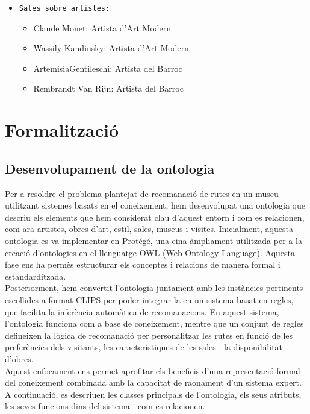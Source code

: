 \documentclass[a4paper]{article}
\begin{document}
	\begin{itemize}
		\item \texttt{Sales sobre artistes: } 
		\begin{itemize}
			\item Claude Monet: Artista d'Art Modern
			\item Wassily Kandinsky: Artista d'Art Modern
			\item ArtemisiaGentileschi: Artista del Barroc
			\item Rembrandt Van Rijn: Artista del Barroc
		\end{itemize}
	\end{itemize}
	
	\newpage
	\section{Formalització}
	
	\subsection{Desenvolupament de la ontologia}
	
	Per a resoldre el problema plantejat de recomanació de rutes en un museu utilitzant sistemes basats en el coneixement, hem desenvolupat una ontologia que descriu els elements que hem considerat clau d’aquest entorn i com es relacionen, com ara artistes, obres d’art, estil, sales, museus i visites. Inicialment, aquesta ontologia es va implementar en Protégé, una eina àmpliament utilitzada per a la creació d’ontologies en el llenguatge OWL (Web Ontology Language). Aquesta fase ens ha permès estructurar els conceptes i relacions de manera formal i estandarditzada. \\
	
	Posteriorment, hem convertit l’ontologia juntament amb les instàncies pertinents escollides a format CLIPS per poder integrar-la en un sistema basat en regles, que facilita la inferència automàtica de recomanacions. En aquest sistema, l’ontologia funciona com a base de coneixement, mentre que un conjunt de regles defineixen la lògica de recomanació per personalitzar les rutes en funció de les preferències dels visitants, les característiques de les sales i la disponibilitat d’obres. \\
	
	Aquest enfocament ens permet aprofitar els beneficis d’una representació formal del coneixement combinada amb la capacitat de raonament d’un sistema expert. A continuació, es descriuen les classes principals de l’ontologia, els seus atributs, les seves funcions dins del sistema i com es relacionen. \\
	
\end{document}
